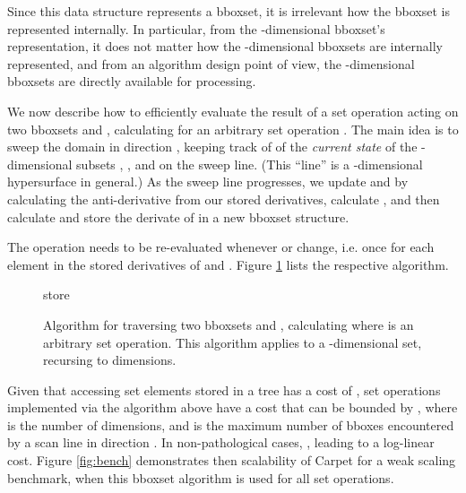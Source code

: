 \documentclass[conference]{IEEEtran}
\begin{document}
Since this data structure represents a bboxset, it is irrelevant how
the bboxset is represented internally. In particular, from the
-dimensional bboxset's representation, it does not matter how the
-dimensional bboxsets are internally represented, and from an
algorithm design point of view, the -dimensional bboxsets are
directly available for processing.

We now describe how to efficiently evaluate the result of a set
operation acting on two bboxsets  and , calculating  for an arbitrary set operation .
The main idea is to sweep the domain in direction ,
keeping track of of the \emph{current state} of the -dimensional
subsets , , and  on the sweep line.
(This ``line'' is a -dimensional hypersurface in general.)
As the sweep line progresses, we update  and  by
calculating the anti-derivative from our stored derivatives, calculate
, and then calculate and store the
derivate of  in a new bboxset structure.

The operation  needs to be
re-evaluated whenever  or  change, i.e. once for
each element in the stored derivatives of  and .
Figure \ref{fig:bboxset-traverse} lists the respective algorithm.



\begin{figure}
  \begin{algorithmic}
    \STMT 
    \STMT 
    \STMT 
    \STMT 
    \STMT 
    \ENDIF
    \STMT 
    \ENDIF
    \STMT 
    \STMT 
    \STMT 
    \STMT store 
    \ENDIF
    \ENDWHILE
  \end{algorithmic}
  \caption{Algorithm for traversing two bboxsets  and ,
    calculating  where  is an arbitrary set
    operation. This algorithm applies to a
    -dimensional set, recursing to  dimensions.}
  \label{fig:bboxset-traverse}
\end{figure}

Given that accessing set elements stored in a tree has a cost of
, set operations implemented via the algorithm above have a
cost that can be bounded by , where  is the
number of dimensions, and  is the maximum number of bboxes
encountered by a scan line in direction . In non-pathological
cases, , leading to a log-linear cost. Figure
\ref{fig:bench} demonstrates then scalability of Carpet for a weak
scaling benchmark, when this bboxset algorithm is used for all set
operations.
\end{document}
